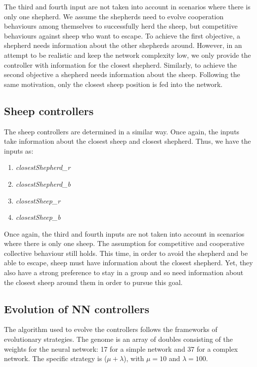 \documentclass[conference]{IEEEtran}
\begin{document}
The third and fourth input are not taken into account in scenarios where there is only one shepherd. 
We assume the shepherds need to evolve cooperation behaviours among themselves to successfully herd the sheep, but competitive behaviours against sheep who want to escape. To achieve the first objective, a shepherd needs information about the other shepherds around. However, in an attempt to be realistic and keep the network complexity low, we only provide the controller with information for the closest shepherd. Similarly, to achieve the second objective a shepherd needs information about the sheep. Following the same motivation, only the closest sheep position is fed into the network. 

\subsection{Sheep controllers}
The sheep controllers are determined in a similar way. Once again, the inputs take information about the closest sheep and closest shepherd. Thus, we have the inputs as:

\begin{enumerate}
	\item \textit{closestShepherd\_r}
	\item \textit{closestShepherd\_b}
	\item \textit{closestSheep\_r}
	\item \textit{closestSheep\_b}
\end{enumerate}

Once again, the third and fourth inputs are not taken into account in scenarios where there is only one sheep. 
The assumption for competitive and cooperative collective behaviour still holds. This time, in order to avoid the shepherd and be able to escape, sheep must have information about the closest shepherd. Yet, they also have a strong preference to stay in a group and so need information about the closest sheep around them in order to pursue this goal. 

 

\subsection{Evolution of NN controllers}
The algorithm used to evolve the controllers follows the frameworks of evolutionary strategies. The genome is an array of doubles consisting of the weights for the neural network: 17 for a simple network and 37 for a complex network. The specific strategy is ($\mu + \lambda$), with $\mu = 10$ and $\lambda = 100$. 
\end{document}
